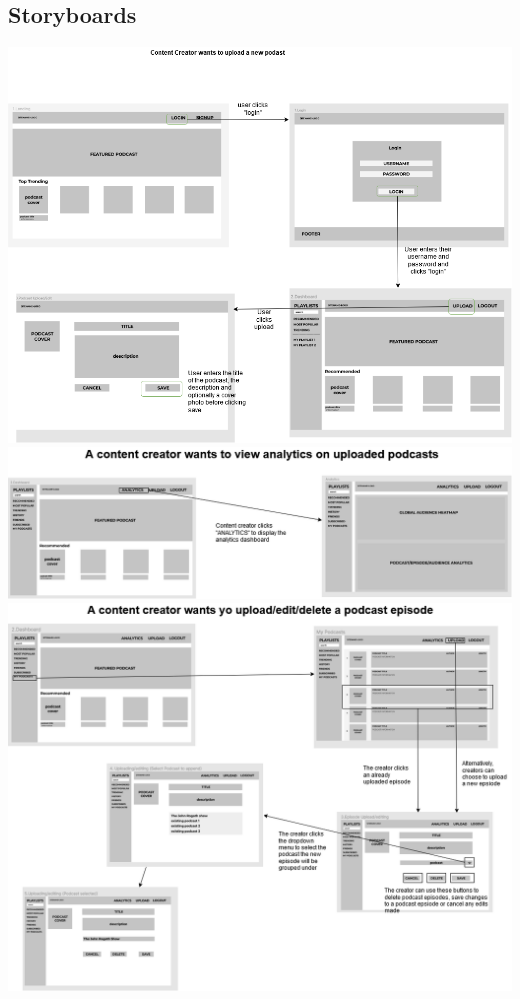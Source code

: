 \documentclass[12pt]{article}
\begin{document}
\begin{appendices}
    \section{Storyboards}\label{app:storyboards}
    \begin{center}
        \includegraphics[width=\textwidth]{resources/uploading_podcasts}
        \includegraphics[width=\textwidth]{resources/analytics}
        \includegraphics[width=\textwidth]{resources/upload_edit_delete}


\end{center}
\end{appendices}
\end{document}
